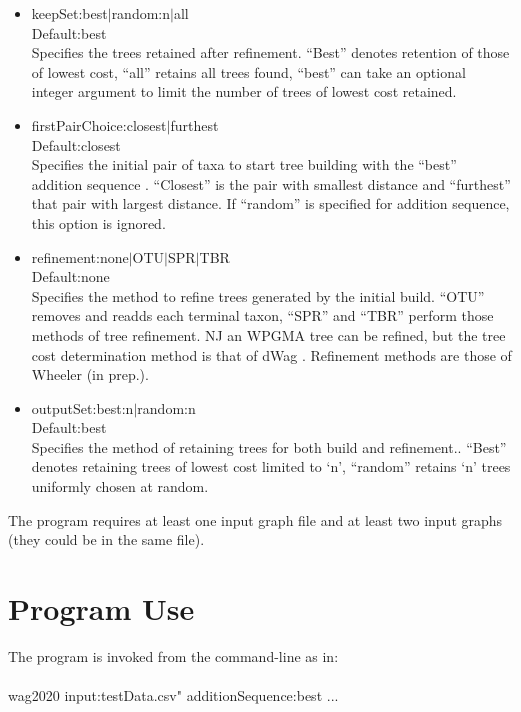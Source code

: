 \documentclass[11pt]{memoir}
\begin{document}
\begin{itemize}
{			argument to limit the number of trees of lowest cost retained.
		}
		\item{keepSet:best$\mid$random:n$\mid$all\\Default:best\\Specifies the trees retained after refinement.
			``Best'' denotes retention of those of lowest cost, ``all'' retains all trees found, ``best'' can take an optional integer
			argument to limit the number of trees of lowest cost retained.
		}
		\item{firstPairChoice:closest$\mid$furthest\\Default:closest\\Specifies the initial pair of taxa to start tree building with the ``best''
			addition sequence \citep{Farris1972}.  ``Closest'' is the pair with smallest distance and ``furthest'' that pair with largest distance.
			If ``random'' is specified for addition sequence, this option is ignored.
		}
		\item{refinement:none$\mid$OTU$\mid$SPR$\mid$TBR\\Default:none\\Specifies the method to refine trees generated by
			the initial build.  ``OTU'' removes and readds each terminal taxon, ``SPR'' and ``TBR'' perform those methods of 
			tree refinement.  NJ an WPGMA tree can be refined, but the tree cost determination method is that of dWag \citep{Farris1972}.
			Refinement methods are those of Wheeler (in prep.).
		}
		\item{outputSet:best:n$\mid$random:n\\Default:best\\Specifies the method of retaining trees for both build and refinement..
		``Best'' denotes retaining trees of lowest cost limited to `n', ``random'' retains `n' trees uniformly chosen at random.
	}
	
	\end{itemize}
	
	The program requires at least one input graph file and at least two input graphs (they could be in the same file).

	
	\section{Program Use}
	The program is invoked from the command-line as in:\\
	\\
	wag2020 input:testData.csv" additionSequence:best ...\\
	
\end{document}
